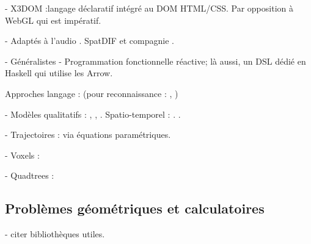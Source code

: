 \documentclass[french,12pt]{article}
\begin{document}
- X3DOM :langage déclaratif intégré au DOM HTML/CSS\cite{jankowski_declarative_2013}. Par opposition à WebGL qui est impératif.

- Adaptés à l'audio
. SpatDIF et compagnie \cite{peters_spatial_2013}\cite{kendall_towards_2008}
. \cite{kondoz_object-based_2014}

- Généralistes
- Programmation fonctionnelle réactive; là aussi, un DSL dédié en Haskell qui utilise les Arrow.
\cite{hudak_arrows_2003}

Approches langage : (pour reconnaissance : \cite{spranger_recruitment_2011}\cite{spranger_emergent_2012}, )

- Modèles qualitatifs : \cite{chen_survey_2015}, \cite{bhatt_geospatial_2014}, \cite{schlieder_qualitative_1996,dorr_qualitative_2014}. Spatio-temporel : \cite{hazarika_qualitative_2012}. \cite{clementini_global_1997}.

- Trajectoires : via équations paramétriques.

- Voxels : \cite{kaufman_volume_1993}

- Quadtrees : \cite{eppstein_skip_2008}
\subsection{Problèmes géométriques et calculatoires}
- citer bibliothèques utiles.
\printbibliography
\end{document}
